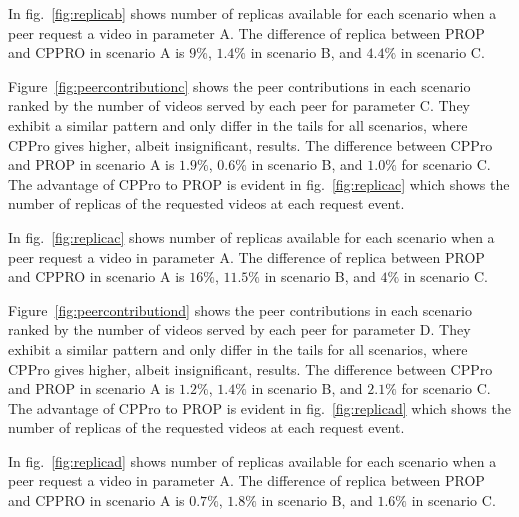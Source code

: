 \documentclass[10pt,final,journal,a4paper]{IEEEtran}
\begin{document}

In fig.~\ref{fig:replicab} shows number of replicas available for each scenario when a peer request a video in parameter A.
The difference of replica between PROP and CPPRO in scenario A is $9\%$, $1.4\%$ in scenario B, and $4.4\%$ in scenario C.

Figure~\ref{fig:peercontributionc} shows the peer contributions in each scenario ranked by the number of videos served by each peer for parameter C.
They exhibit a similar pattern and only differ in the tails for all scenarios, where CPPro gives higher, albeit insignificant, results.
The difference between CPPro and PROP in scenario A is $1.9\%$, $0.6\%$ in scenario B, and $1.0\%$ for scenario C.
The advantage of CPPro to PROP is evident in fig.~\ref{fig:replicac} which shows the number of replicas of the requested videos at each request event.

In fig.~\ref{fig:replicac} shows number of replicas available for each scenario when a peer request a video in parameter A.
The difference of replica between PROP and CPPRO in scenario A is $16\%$, $11.5\%$ in scenario B, and $4\%$ in scenario C.


Figure~\ref{fig:peercontributiond} shows the peer contributions in each scenario ranked by the number of videos served by each peer for parameter D.
They exhibit a similar pattern and only differ in the tails for all scenarios, where CPPro gives higher, albeit insignificant, results.
The difference between CPPro and PROP in scenario A is $1.2\%$, $1.4\%$ in scenario B, and $2.1\%$ for scenario C.
The advantage of CPPro to PROP is evident in fig.~\ref{fig:replicad} which shows the number of replicas of the requested videos at each request event.

In fig.~\ref{fig:replicad} shows number of replicas available for each scenario when a peer request a video in parameter A.
The difference of replica between PROP and CPPRO in scenario A is $0.7\%$, $1.8\%$ in scenario B, and $1.6\%$ in scenario C.
\end{document}
